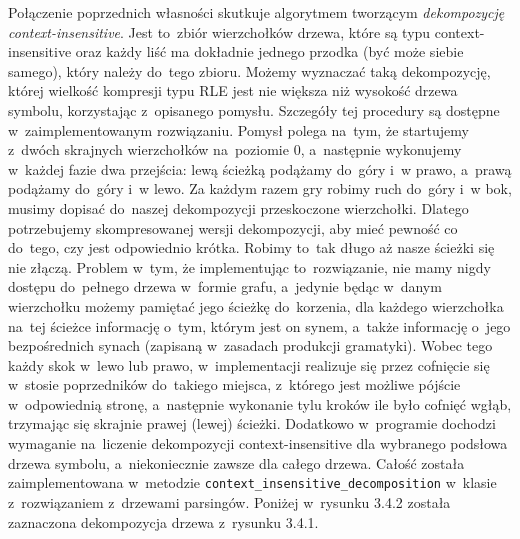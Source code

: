 \documentclass[declaration,shortabstract]{iithesis}
\theoremstyle{definition} \newtheorem{definition}{Definicja}[chapter]
\theoremstyle{plain} \newtheorem{remark}[definition]{Obserwacja}
\theoremstyle{plain} \newtheorem{theorem}[definition]{Twierdzenie}
\theoremstyle{plain} \newtheorem{example}{Przykład}[definition]
\theoremstyle{plain} \newtheorem{lemma}[definition]{Lemat}
\begin{document}
Połączenie poprzednich własności skutkuje algorytmem tworzącym \textit{dekompozycję context-insensitive}. Jest to~zbiór wierzchołków drzewa, które są typu context-insensitive oraz każdy liść ma dokładnie jednego przodka (być może siebie samego), który należy do~tego zbioru. Możemy wyznaczać taką dekompozycję, której wielkość kompresji typu RLE jest nie większa niż wysokość drzewa symbolu, korzystając z~opisanego pomysłu. Szczegóły tej procedury są dostępne w~zaimplementowanym rozwiązaniu. Pomysł polega na~tym, że startujemy z~dwóch skrajnych wierzchołków na~poziomie $0$, a~następnie wykonujemy w~każdej fazie dwa przejścia: lewą ścieżką podążamy do~góry i~w prawo, a~prawą podążamy do~góry i~w lewo. Za każdym razem gry robimy ruch do~góry i~w bok, musimy dopisać do~naszej dekompozycji przeskoczone wierzchołki. Dlatego potrzebujemy skompresowanej wersji dekompozycji, aby mieć pewność co do~tego, czy jest odpowiednio krótka. Robimy to~tak długo aż nasze ścieżki się nie złączą. Problem w~tym, że implementując to~rozwiązanie, nie mamy nigdy dostępu do~pełnego drzewa w~formie grafu, a~jedynie będąc w~danym wierzchołku możemy pamiętać jego ścieżkę do~korzenia, dla każdego wierzchołka na~tej ścieżce informację o~tym, którym jest on synem, a~także informację o~jego bezpośrednich synach (zapisaną w~zasadach produkcji gramatyki). Wobec tego każdy skok w~lewo lub prawo, w~implementacji realizuje się przez cofnięcie się w~stosie poprzedników do~takiego miejsca, z~którego jest możliwe pójście w~odpowiednią stronę, a~następnie wykonanie tylu kroków ile było cofnięć wgłąb, trzymając się skrajnie prawej (lewej) ścieżki. Dodatkowo w~programie dochodzi wymaganie na~liczenie dekompozycji context-insensitive dla wybranego podsłowa drzewa symbolu, a~niekoniecznie zawsze dla całego drzewa. Całość została zaimplementowana w~metodzie \texttt{context\_insensitive\_decomposition} w~klasie z~rozwiązaniem z~drzewami parsingów. Poniżej w~rysunku 3.4.2 została zaznaczona dekompozycja drzewa z~rysunku 3.4.1.
\end{document}
